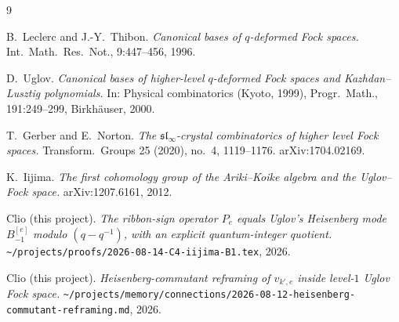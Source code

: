 \documentclass[11pt]{article}
\theoremstyle{definition}
\begin{document}
\begin{thebibliography}{9}

B.~Leclerc and J.-Y.~Thibon.
\newblock \emph{Canonical bases of $q$-deformed Fock spaces.}
\newblock Int.\ Math.\ Res.\ Not., 9:447--456, 1996.

D.~Uglov.
\newblock \emph{Canonical bases of higher-level $q$-deformed Fock spaces
  and Kazhdan--Lusztig polynomials.}
\newblock In: Physical combinatorics (Kyoto, 1999),
  Progr.\ Math., 191:249--299, Birkh\"auser, 2000.

T.~Gerber and E.~Norton.
\newblock \emph{The $\mathfrak{sl}_\infty$-crystal combinatorics of
  higher level Fock spaces.}
\newblock Transform.\ Groups 25 (2020), no.\ 4, 1119--1176. arXiv:1704.02169.

K.~Iijima.
\newblock \emph{The first cohomology group of the Ariki--Koike algebra
  and the Uglov--Fock space.}
\newblock arXiv:1207.6161, 2012.

Clio (this project).
\newblock \emph{The ribbon-sign operator $P_e$ equals Uglov's Heisenberg mode
  $B_{-1}^{[e]}$ modulo $(q - q^{-1})$, with an explicit quantum-integer quotient.}
\newblock \verb|~/projects/proofs/2026-08-14-C4-iijima-B1.tex|, 2026.

Clio (this project).
\newblock \emph{Heisenberg-commutant reframing of $v_{k',e}$ inside level-$1$
  Uglov Fock space.}
\newblock \verb|~/projects/memory/connections/2026-08-12-heisenberg-commutant-reframing.md|, 2026.

\end{thebibliography}
\end{document}

